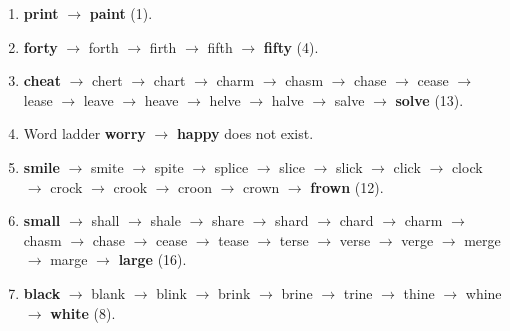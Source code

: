 \documentclass{article}
\begin{document}
\begin{enumerate}
    \item \textbf{print} $\rightarrow$ \textbf{paint} (1).
    \item \textbf{forty} $\rightarrow$ forth $\rightarrow$ firth $\rightarrow$ fifth $\rightarrow$ \textbf{fifty} (4).
    \item \textbf{cheat} $\rightarrow$ chert $\rightarrow$ chart $\rightarrow$ charm $\rightarrow$ chasm $\rightarrow$ chase $\rightarrow$ cease $\rightarrow$ lease $\rightarrow$ leave $\rightarrow$ heave $\rightarrow$ helve $\rightarrow$ halve $\rightarrow$ salve $\rightarrow$ \textbf{solve} (13).
    \item Word ladder \textbf{worry} $\rightarrow$ \textbf{happy} does not exist.
    \item \textbf{smile} $\rightarrow$ smite $\rightarrow$ spite $\rightarrow$ splice $\rightarrow$ slice $\rightarrow$ slick $\rightarrow$ click $\rightarrow$ clock $\rightarrow$ crock $\rightarrow$ crook $\rightarrow$ croon $\rightarrow$ crown $\rightarrow$ \textbf{frown} (12).
    \item \textbf{small} $\rightarrow$ shall $\rightarrow$ shale $\rightarrow$ share $\rightarrow$ shard $\rightarrow$ chard $\rightarrow$ charm $\rightarrow$ chasm $\rightarrow$ chase $\rightarrow$ cease $\rightarrow$ tease $\rightarrow$ terse $\rightarrow$ verse $\rightarrow$ verge $\rightarrow$ merge $\rightarrow$ marge $\rightarrow$ \textbf{large} (16).
    \item \textbf{black} $\rightarrow$ blank $\rightarrow$ blink $\rightarrow$ brink $\rightarrow$ brine $\rightarrow$ trine $\rightarrow$ thine $\rightarrow$ whine $\rightarrow$ \textbf{white} (8).
\end{enumerate}
\end{document}

